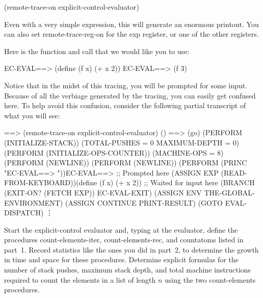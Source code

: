 \beginlisp
(remote-trace-on explicit-control-evaluator)
\endlisp

Even with a very simple expression, this will generate an enormous
printout.  You can also set {\cf remote-trace-reg-on} for the {\cf
exp} register, or one of the other registers.

\medskip


Here is the function and call that we would like you to use:

\beginlisp
EC-EVAL==> (define (f x) (+ x 2))
EC-EVAL==> (f 3)
\endlisp

Notice that in the midst of this tracing, you will be prompted for some input.
Because of all the verbiage generated by the tracing, you can easily get
confused here. To help avoid this confusion, consider the following partial
transcript of what you will see:

\beginlisp
==> (remote-trace-on explicit-control-evaluator)
()
\null
==> (go)
(PERFORM (INITIALIZE-STACK))
(TOTAL-PUSHES = 0 MAXIMUM-DEPTH = 0)
(PERFORM (INITIALIZE-OPS-COUNTER))
(MACHINE-OPS = 8)
(PERFORM (NEWLINE))
\null
(PERFORM (NEWLINE))
\null
(PERFORM (PRINC "EC-EVAL==> "))EC-EVAL==>                ;; Prompted here
(ASSIGN EXP (READ-FROM-KEYBOARD))(define (f x) (+ x 2))  ;; Waited for input here
(BRANCH (EXIT-ON? (FETCH EXP)) EC-EVAL-EXIT)
(ASSIGN ENV THE-GLOBAL-ENVIRONMENT)
(ASSIGN CONTINUE PRINT-RESULT)
(GOTO EVAL-DISPATCH)
     \vdots
\endlisp

\medskip


\medskip

 Start the explicit-control evaluator and,
typing at the evaluator, define the procedures {\cf
count-elements-iter,} {\cf count-elements-rec,} and {\cf countatoms}
listed in part~1.  Record statistics like the ones you did in part~2, to
determine the growth in time and space for these procedures.
Determine explicit formulas for the number of stack pushes, maximum
stack depth, and total machine instructions required to count the
elements in a list of length $n$ using the two {\cf count-elements}
procedures.

